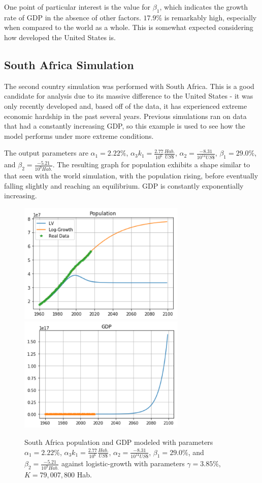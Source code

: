 \documentclass[a4paper]{article}
\begin{document}
One point of particular interest is the value for $\beta_1$, which indicates the growth rate of GDP in the absence of other factors. $17.9\%$ is remarkably high, especially when compared to the world as a whole. This is somewhat expected considering how developed the United States is. 

\subsection{South Africa Simulation}

The second country simulation was performed with South Africa. This is a good candidate for analysis due to its massive difference to the United States - it was only recently developed and, based off of the data, it has experienced extreme economic hardship in the past several years. Previous simulations ran on data that had a constantly increasing GDP, so this example is used to see how the model performs under more extreme conditions.

The output parameters are $\alpha_1 = 2.22\%$, $\alpha_3 k_1 = \frac{2.77}{10^{6}}\frac{Hab.}{US \$}$, $\alpha_2 = \frac{-8.31}{10^{14} US\$}$, $\beta_1 = 29.0\%$, and $\beta_2 = \frac{-5.21}{10^{9} Hab.}$. The resulting graph for population exhibits a shape similar to that seen with the world simulation, with the population rising, before eventually falling slightly and reaching an equilibrium. GDP is constantly exponentially increasing.

\begin{figure}[t!]
\includegraphics[width=80mm]{images/sa-pop.png}
\includegraphics[width=80mm]{images/sa-gdp.png}
\caption{South Africa population and GDP modeled with parameters $\alpha_1 = 2.22\%$, $\alpha_3 k_1 = \frac{2.77}{10^{6}}\frac{Hab.}{US \$}$, $\alpha_2 = \frac{-8.31}{10^{14} US\$}$, $\beta_1 = 29.0\%$, and $\beta_2 = \frac{-5.21}{10^{9} Hab.}$ against logistic-growth with parameters   $\gamma = 3.85\%$, $K = 79,007,800$ Hab. \label{overflow}}
\end{figure}
\end{document}
